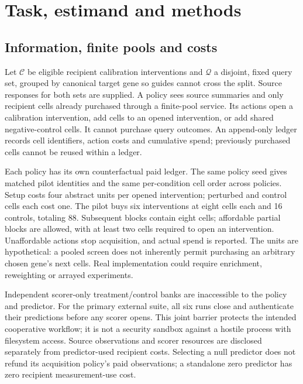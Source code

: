 \section{Task, estimand and methods}
\label{sec:methods}
\subsection{Information, finite pools and costs}
Let $\mathcal C$ be eligible recipient calibration interventions and $\mathcal Q$ a disjoint, fixed query set, grouped by canonical target gene so guides cannot cross the split. Source responses for both sets are supplied. A policy sees source summaries and only recipient cells already purchased through a finite-pool service. Its actions open a calibration intervention, add cells to an opened intervention, or add shared negative-control cells. It cannot purchase query outcomes. An append-only ledger records cell identifiers, action costs and cumulative spend; previously purchased cells cannot be reused within a ledger.

Each policy has its own counterfactual paid ledger. The same policy seed gives matched pilot identities and the same per-condition cell order across policies. Setup costs four abstract units per opened intervention; perturbed and control cells each cost one. The pilot buys six interventions at eight cells each and 16 controls, totaling 88. Subsequent blocks contain eight cells; affordable partial blocks are allowed, with at least two cells required to open an intervention. Unaffordable actions stop acquisition, and actual spend is reported. The units are hypothetical: a pooled screen does not inherently permit purchasing an arbitrary chosen gene's next cells. Real implementation could require enrichment, reweighting or arrayed experiments.

Independent scorer-only treatment/control banks are inaccessible to the policy and predictor. For the primary external suite, all six runs close and authenticate their predictions before any scorer opens. This joint barrier protects the intended cooperative workflow; it is not a security sandbox against a hostile process with filesystem access. Source observations and scorer resources are disclosed separately from predictor-used recipient costs. Selecting a null predictor does not refund its acquisition policy's paid observations; a standalone zero predictor has zero recipient measurement-use cost.

